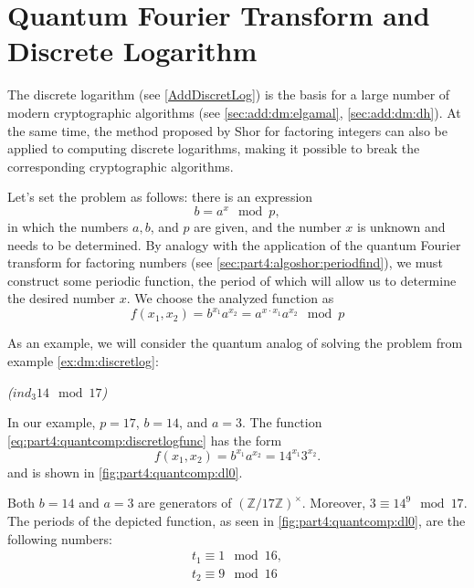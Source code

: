 \section{Quantum Fourier Transform and Discrete Logarithm}
The discrete logarithm (see \autoref{AddDiscretLog}) is the basis for
a large number of modern cryptographic algorithms (see
\autoref{sec:add:dm:elgamal}, \autoref{sec:add:dm:dh}). At the same time, 
the method proposed by Shor for factoring integers can also be
applied to computing discrete logarithms, making it possible to break
the corresponding cryptographic algorithms.

Let's set the problem as follows: there is an expression
\[
b = a^x \mod p,
\]
in which the numbers $a, b$, and $p$ are given, and the number $x$ is
unknown and needs to be determined. By analogy with the application
of the quantum Fourier transform for factoring numbers (see
\autoref{sec:part4:algoshor:periodfind}), we must
construct some periodic function, the period of which will allow us to
determine the desired number $x$. We choose the analyzed function as
\begin{equation}
f\left(x_1, x_2\right) = b^{x_1}a^{x_2} = a^{x \cdot x_1} a^{x_2} \mod p
\label{eq:part4:quantcomp:discretlogfunc}
\end{equation}

As an example, we will consider the quantum analog of solving the problem from example
\ref{ex:dm:discretlog}:
\begin{example}
\emph{($ind_3{14} \mod{17}$)}
%

In our example, $p = 17$, $b=14$, and $a=3$. The function
\eqref{eq:part4:quantcomp:discretlogfunc} has the form
\[
f\left(x_1, x_2\right) = b^{x_1}a^{x_2} = 14^{x_1}3^{x_2}.
\]
and is shown in \autoref{fig:part4:quantcomp:dl0}.

Both $b=14$ and $a=3$ are generators of
$\left(\mathbb{Z}/17\mathbb{Z}\right)^\times$. Moreover, $3 \equiv 14^9
\mod 17$. The periods of the depicted function, as seen in
\autoref{fig:part4:quantcomp:dl0}, are the following numbers:
\begin{eqnarray}
t_1 \equiv 1 \mod 16,
\nonumber \\
t_2 \equiv 9 \mod 16
\end{eqnarray} 
\label{ex:part4:quantcomp:discretlog:periodfinding0}
\end{example}


